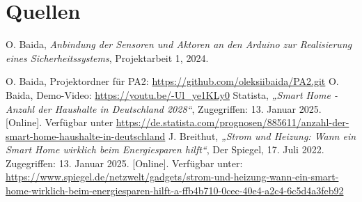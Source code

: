 \documentclass[12pt, letterpaper]{article}
\begin{document}
\section{Quellen}
\begin{thebibliography}{20}
  O. Baida,
  \textit{Anbindung der Sensoren und Aktoren an den Arduino zur Realisierung eines Sicherheitssystems},
  Projektarbeit 1, 2024.

  O. Baida, Projektordner für PA2: \url{https://github.com/oleksiibaida/PA2.git}
  O. Baida, Demo-Video: \url{https://youtu.be/-Ul_ye1KLy0}
  Statista, \textit{„Smart Home - Anzahl der Haushalte in Deutschland 2028“}, Zugegriffen: 13. Januar 2025. [Online]. Verfügbar unter \url{https://de.statista.com/prognosen/885611/anzahl-der-smart-home-haushalte-in-deutschland}
  J. Breithut, \textit{„Strom und Heizung: Wann ein Smart Home wirklich beim Energiesparen hilft“}, Der Spiegel, 17. Juli 2022. Zugegriffen: 13. Januar 2025. [Online]. Verfügbar unter: \url{https://www.spiegel.de/netzwelt/gadgets/strom-und-heizung-wann-ein-smart-home-wirklich-beim-energiesparen-hilft-a-ffb4b710-0cec-40e4-a2c4-6c5d4a3feb92}



\end{thebibliography}
\end{document}
